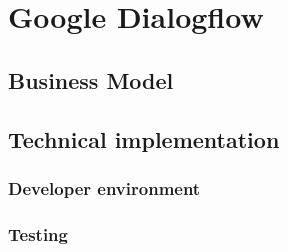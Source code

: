 \chapter{Google Dialogflow}

\section{Business Model}

\section{Technical implementation}

\subsection{Developer environment}

\subsection{Testing}